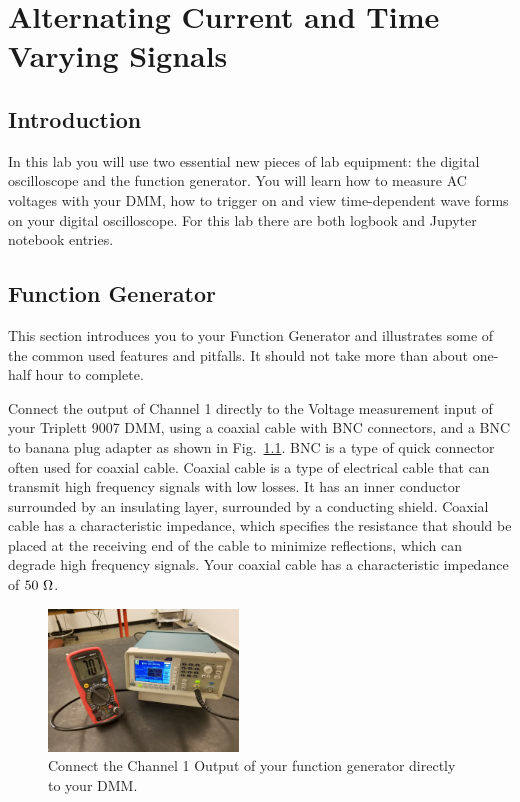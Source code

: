 \chapter{Alternating Current and Time Varying Signals}

\section{Introduction}

In this lab you will use two essential new pieces of lab equipment:
the digital oscilloscope and the function generator.  You will learn
how to measure AC voltages with your DMM, how to trigger on and view
time-dependent wave forms on your digital oscilloscope.  For this lab
there are both logbook and Jupyter notebook entries.


\section{Function Generator}

This section introduces you to your Function Generator and illustrates
some of the common used features and pitfalls.  It should not take
more than about one-half hour to complete.

Connect the output of Channel 1 directly to the Voltage measurement
input of your Triplett 9007 DMM, using a coaxial cable with BNC
connectors, and a BNC to banana plug adapter as shown in
Fig.~\ref{fig:dmm_setup}.  BNC is a type of quick connector often used
for coaxial cable.  Coaxial cable is a type of electrical cable that
can transmit high frequency signals with low losses. It has an inner
conductor surrounded by an insulating layer, surrounded by a
conducting shield.  Coaxial cable has a characteristic impedance,
which specifies the resistance that should be placed at the receiving
end of the cable to minimize reflections, which can degrade high
frequency signals.  Your coaxial cable has a characteristic impedance
of $50~\rm \Omega$.

\begin{figure}[htbp]
\begin{center}
\includegraphics[width=0.45\textwidth]{figs/labs/lissajous/generator_dmm_setup.jpg} 
\caption{Connect the Channel 1 Output of your function generator directly to your DMM.}
\label{fig:dmm_setup}
\end{center}
\end{figure}

